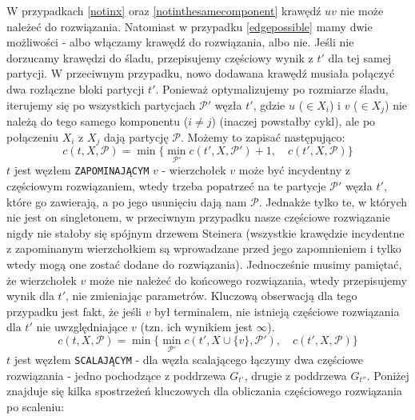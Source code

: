 \documentclass[12pt, oneside]{report}
\begin{document}
W przypadkach \ref{notinx} oraz \ref{notinthesamecomponent} krawędź $uv$ nie może należeć do rozwiązania. Natomiast w przypadku \ref{edgepossible} mamy dwie możliwości - albo włączamy krawędź do rozwiązania, albo nie. Jeśli nie dorzucamy krawędzi do śladu, przepisujemy częściowy wynik z $t'$ dla tej samej partycji. W przeciwnym przypadku, nowo dodawana krawędź musiała połączyć dwa rozłączne bloki partycji $t'$. Ponieważ optymalizujemy po rozmiarze śladu, iterujemy się po wszystkich partycjach $\mathcal{P}'$ węzła $t'$, gdzie $u$ ($\in X_i$) i $v$ ($\in X_j$) nie należą do tego samego komponentu ($i \neq j$) (inaczej powstałby cykl), ale po połączeniu $X_i$ z $X_j$ dają partycję $\mathcal{P}$. Możemy to zapisać następująco:
$$c(t, X, \mathcal{P}) = \min \big\{ \min\limits_{\mathcal{P}'} c(t', X, \mathcal{P}') + 1, \quad c(t', X, \mathcal{P}) \big\}$$
\newline
$t$ jest węzłem \texttt{ZAPOMINAJĄCYM} $v$ - wierzchołek $v$ może być incydentny z częściowym rozwiązaniem, wtedy trzeba popatrzeć na te partycje $\mathcal{P}'$ węzła $t'$, które go zawierają, a po jego usunięciu dają nam $\mathcal{P}$. Jednakże tylko te, w których nie jest on singletonem, w przeciwnym przypadku nasze częściowe rozwiązanie nigdy nie stałoby się spójnym drzewem Steinera (wszystkie krawędzie incydentne z zapominanym wierzchołkiem są wprowadzane przed jego zapomnieniem i tylko wtedy mogą one zostać dodane do rozwiązania). Jednocześnie musimy pamiętać, że wierzchołek $v$ może nie należeć do końcowego rozwiązania, wtedy przepisujemy wynik dla $t'$, nie zmieniając parametrów. Kluczową obserwacją dla tego przypadku jest fakt, że jeśli $v$ był terminalem, nie istnieją częściowe rozwiązania dla $t'$ nie uwzględniające $v$ (tzn. ich wynikiem jest $\infty$).
$$c(t, X, \mathcal{P}) = \min \big\{ \min\limits_{\mathcal{P}'} c(t', X \cup \{v\}, \mathcal{P}'), \quad c(t', X, \mathcal{P}) \big\}$$
\newline
$t$ jest węzłem \texttt{SCALAJĄCYM} - dla węzła scalającego łączymy dwa częściowe rozwiązania - jedno pochodzące z poddrzewa $G_{t'}$, drugie z poddrzewa $G_{t''}$. Poniżej znajduje się kilka spostrzeżeń kluczowych dla obliczania częściowego rozwiązania po scaleniu:
\end{document}
